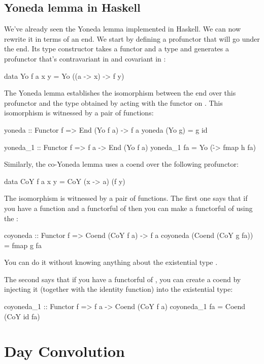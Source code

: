 \documentclass[DaoFP]{subfiles}
\begin{document}
\subsection{Yoneda lemma in Haskell}

We've already seen the Yoneda lemma implemented in Haskell. We can now rewrite it in terms of an end. We start by defining a profunctor that will go under the end. Its type constructor takes a functor  and a type  and generates a profunctor that's contravariant in  and covariant in :
\begin{haskell}
data Yo f a x y = Yo ((a -> x) -> f y)
\end{haskell}
The Yoneda lemma establishes the isomorphism between the end over this profunctor and the type obtained by acting with the functor   on . This isomorphism is witnessed by a pair of functions:
\begin{haskell}
yoneda :: Functor f => End (Yo f a) -> f a
yoneda (Yo g) = g id

yoneda_1 :: Functor f => f a -> End (Yo f a)
yoneda_1 fa = Yo (\h -> fmap h fa)
\end{haskell}

Similarly, the co-Yoneda lemma uses a coend over the following profunctor:
\begin{haskell}
data CoY f a x y = CoY (x -> a) (f y)
\end{haskell}
The isomorphism is witnessed by a pair of functions. The first one says that if you have a function  and a functorful of  then you can make a functorful of  using the :
\begin{haskell}
coyoneda :: Functor f => Coend (CoY f a) -> f a
coyoneda (Coend (CoY g fa)) = fmap g fa
\end{haskell}
You can do it without knowing anything about the existential type .

The second says that if you have a functorful of , you can create a coend by injecting it (together with the identity function) into the existential type:
\begin{haskell}
coyoneda_1 :: Functor f => f a -> Coend (CoY f a)
coyoneda_1 fa = Coend (CoY id fa)
\end{haskell}

\section{Day Convolution}
\end{document}
